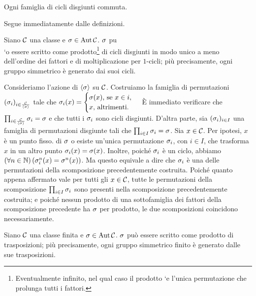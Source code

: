 \begin{Theorem}
	Ogni famiglia di cicli disgiunti commuta.
\end{Theorem}
\Proof
Segue immediatamente dalle definizioni.
\EndProof
\begin{Theorem}
	Siano $\mathcal{C}$ una classe e $\Permutation \in \Automorphisms{\Class}$.
	$\Permutation$ pu\\`o essere scritto come prodotto\footnote{Eventualmente infinito, nel qual caso il prodotto `e l'unica permutazione che prolunga tutti i fattori.} di cicli disgiunti
	in modo unico a meno dell'ordine dei fattori e di moltiplicazione per $1$-cicli;
	pi\`u precisamente, ogni gruppo simmetrico \`e generato dai suoi cicli.
\end{Theorem}
\Proof
Consideriamo l'azione di $\SpanGroup{\Permutation}$ su $\mathcal{C}$.
Costruiamo la famiglia di permutazioni
$(\Permutation_i)_{i \in \Quotient{\Class}{\SpanGroup{\Permutation}}}$
tale che $\Permutation_i(x) =
\begin{cases}
\Permutation(x)\text{, se }x \in i,\\
x\text{, altrimenti}.
\end{cases}$
\`E immediato verificare che
$\prod_{i \in \Quotient{\Class}{\SpanGroup{\Permutation}}} \Permutation_i =
\Permutation$ e che tutti i $\Permutation_i$ sono cicli disgiunti.
D'altra parte, sia
$(\Permutation_i)_{i \in I}$ una famiglia di permutazioni disgiunte
tali che $\prod_{i \in I} \Permutation_i = \Permutation$.
Sia $x \in \mathcal{C}$. Per ipotesi, $x$ \`e un punto fisso.
di $\Permutation$ o esiste un'unica permutazione $\Permutation_i$,
con $i \in I$,
che trasforma $x$ in un altro punto $\Permutation_i(x) = \Permutation(x)$.
Inoltre, poich\'e $\Permutation_i$ \`e un ciclo, abbiamo
$\ForAll{n \in \mathbb{N}}{\Permutation_i^n(x) = \Permutation^n(x)}$.
Ma questo equivale a dire che $\Permutation_i$ \`e una delle
permutazioni della scomposizione precedentemente costruita.
Poich\'e quanto appena affermato vale per tutti gli $x \in \mathcal{C}$,
tutte le permutazioni della scomposizione $\prod_{i \in I} \Permutation_i$
sono presenti nella scomposizione precedentemente costruita; e poich\'e
nessun prodotto di una sottofamiglia dei fattori della scomposizione precedente
ha $\Permutation$ per prodotto, le due scomposizioni coincidono necessariamente.
\EndProof
\begin{Corollary}
	Siano $\mathcal{C}$ una classe finita e $\Permutation \in \Automorphisms{\Class}$.
	$\Permutation$ pu\`o essere scritto come prodotto di trasposizioni;
	pi\`u precisamente, ogni gruppo simmetrico finito \`e generato dalle sue
	trasposizioni.
\end{Corollary}
